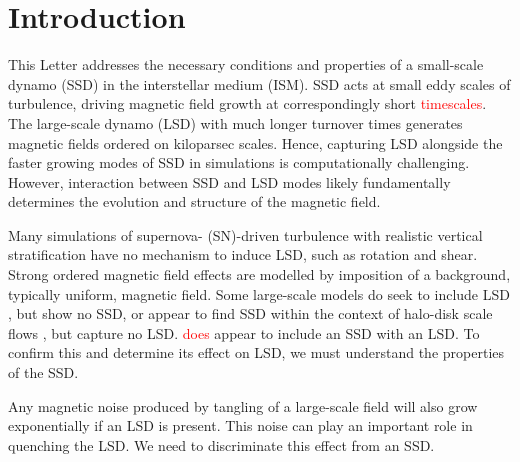 \documentclass[preprint2]{aastex63}
\newcommand{\fg}[1]{\textcolor{midgreen}{#1}}
\newcommand{\mjk}[1]{\textcolor{red}{#1}}
\begin{document}
\section{Introduction}\label{sec:intro}


 This \fg{L}etter addresses the necessary conditions and properties of a
 small-scale dynamo (SSD) in the interstellar medium (ISM).
 SSD acts at small eddy scales of turbulence, driving magnetic field
 growth at correspondingly short \mjk{timescales}.
 \fg{The large-scale dynamo (LSD) with much longer turnover times generates
 magnetic fields ordered on \fg{kiloparsec} scales.}
 Hence, capturing LSD alongside the faster growing modes
 of SSD in simulations is computationally challenging.
 However, \fg{interaction between SSD and LSD modes likely fundamentally}
 \fg{determines the} evolution and structure of the magnetic field.

 Many simulations of supernova- (SN)-driven turbulence with realistic vertical
 stratification \citep[e.g.,][]{deAvillez:2005,PO07,Hill:2012a,HI14} have no
 mechanism to induce LSD, such as rotation and shear.
 Strong ordered magnetic field effects are modelled by
 imposition of a background, typically uniform, magnetic field.
 \fg{Some large-scale models do seek to include LSD 
 \citep[e.g.,][]{Korpi:1999b,Gressel:2008,HWK09,WA09,Pakmor17,
 GE20}, but show no SSD, or appear to find SSD 
 within the context of halo-disk
 scale flows \citep[e.g.,][]{RT16,SBADMN19},  but capture no LSD.}
 \citet{Gent:2013b} \mjk{\citep[additional analysis][]{EGSFB16} does} appear to
 include an \fg{SSD with} \fg{an} \fg{LSD}.
 To confirm this and determine its effect on LSD, we must understand the
 properties of the SSD.
     
 Any magnetic noise produced by tangling \fg{of a large-scale field}
 will also grow exponentially \fg{if an LSD is} present.
 This noise \fg{can play} an important role in quenching the LSD.
 We need to discriminate this effect from an SSD.   
\end{document}
